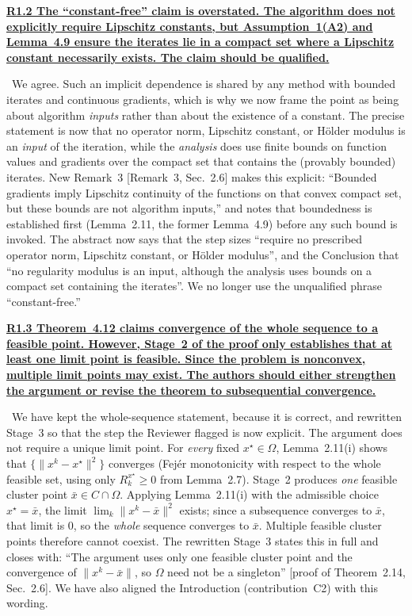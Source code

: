 \documentclass[11pt]{article}
\newcommand{\response}[1]{\smallskip\noindent{\color{blue!60!black}\textbf{Response.}}\ #1\par\medskip}
\newcommand{\loc}[1]{\textcolor{blue!50!black}{[#1]}}
\newenvironment{point}[1]{\medskip\noindent\textbf{\uline{#1}}\par}{\par}
\begin{document}
\begin{point}{R1.2 The ``constant-free'' claim is overstated. The algorithm does not explicitly require Lipschitz constants, but Assumption~1(A2) and Lemma~4.9 ensure the iterates lie in a compact set where a Lipschitz constant necessarily exists. The claim should be qualified.}
\response{We agree. Such an implicit dependence is shared by any method with bounded iterates and continuous gradients, which is why we now frame the point as being about algorithm \emph{inputs} rather than about the existence of a constant. The precise statement is now that no operator norm, Lipschitz constant, or H\"older modulus is an \emph{input} of the iteration, while the \emph{analysis} does use finite bounds on function values and gradients over the compact set that contains the (provably bounded) iterates. New Remark~3 \loc{Remark~3, Sec.~2.6} makes this explicit: ``Bounded gradients imply Lipschitz continuity of the functions on that convex compact set, but these bounds are not algorithm inputs,'' and notes that boundedness is established first (Lemma~2.11, the former Lemma~4.9) before any such bound is invoked. The abstract now says that the step sizes ``require no prescribed operator norm, Lipschitz constant, or H\"older modulus'', and the Conclusion that ``no regularity modulus is an input, although the analysis uses bounds on a compact set containing the iterates''. We no longer use the unqualified phrase ``constant-free.''}
\end{point}

\begin{point}{R1.3 Theorem~4.12 claims convergence of the whole sequence to a feasible point. However, Stage~2 of the proof only establishes that at least one limit point is feasible. Since the problem is nonconvex, multiple limit points may exist. The authors should either strengthen the argument or revise the theorem to subsequential convergence.}
\response{We have kept the whole-sequence statement, because it is correct, and rewritten Stage~3 so that the step the Reviewer flagged is now explicit. The argument does not require a unique limit point. For \emph{every} fixed $x^\star\in\Omega$, Lemma~2.11(i) shows that $\{\lVert x^k-x^\star\rVert^2\}$ converges (Fej\'er monotonicity with respect to the whole feasible set, using only $R^{x^\star}_k\ge0$ from Lemma~2.7). Stage~2 produces \emph{one} feasible cluster point $\bar x\in C\cap\Omega$. Applying Lemma~2.11(i) with the admissible choice $x^\star=\bar x$, the limit $\lim_k\lVert x^k-\bar x\rVert^2$ exists; since a subsequence converges to $\bar x$, that limit is $0$, so the \emph{whole} sequence converges to $\bar x$. Multiple feasible cluster points therefore cannot coexist. The rewritten Stage~3 states this in full and closes with: ``The argument uses only one feasible cluster point and the convergence of $\lVert x^k-\bar x\rVert$, so $\Omega$ need not be a singleton'' \loc{proof of Theorem~2.14, Sec.~2.6}. We have also aligned the Introduction (contribution~C2) with this wording.}
\end{point}
\end{document}
